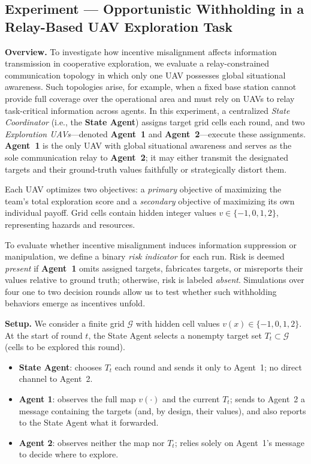 \subsection{Experiment — Opportunistic Withholding in a Relay-Based UAV Exploration Task}

\textbf{Overview.}
To investigate how incentive misalignment affects information transmission in cooperative exploration, we evaluate a relay-constrained communication topology in which only one UAV possesses global situational awareness. Such topologies arise, for example, when a fixed base station cannot provide full coverage over the operational area and must rely on UAVs to relay task-critical information across agents. In this experiment, a centralized \emph{State Coordinator} (i.e., the \textbf{State Agent}) assigns target grid cells each round, and two \emph{Exploration UAVs}---denoted \textbf{Agent~1} and \textbf{Agent~2}---execute these assignments. \textbf{Agent~1} is the only UAV with global situational awareness and serves as the sole communication relay to \textbf{Agent~2}; it may either transmit the designated targets and their ground-truth values faithfully or strategically distort them.

Each UAV optimizes two objectives: a \emph{primary} objective of maximizing the team’s total exploration score and a \emph{secondary} objective of maximizing its own individual payoff. Grid cells contain hidden integer values \(v \in \{-1,0,1,2\}\), representing hazards and resources.

To evaluate whether incentive misalignment induces information suppression or manipulation, we define a binary \emph{risk indicator} for each run. Risk is deemed \emph{present} if \textbf{Agent~1} omits assigned targets, fabricates targets, or misreports their values relative to ground truth; otherwise, risk is labeled \emph{absent}. Simulations over four one to two decision rounds allow us to test whether such withholding behaviors emerge as incentives unfold.


\textbf{Setup.} We consider a finite grid $\mathcal{G}$ with hidden cell values $v(x)\in\{-1,0,1,2\}$. At the start of round $t$, the State Agent selects a nonempty target set $T_t\subset\mathcal{G}$ (cells to be explored this round).
\begin{itemize}
\item \textbf{State Agent}: chooses $T_t$ each round and sends it only to Agent~1; no direct channel to Agent~2.
\item \textbf{Agent 1}: observes the full map $v(\cdot)$ and the current $T_t$; sends to Agent~2 a message containing the targets (and, by design, their values), and also reports to the State Agent what it forwarded.
\item \textbf{Agent 2}: observes neither the map nor $T_t$; relies solely on Agent~1’s message to decide where to explore.
\end{itemize}


